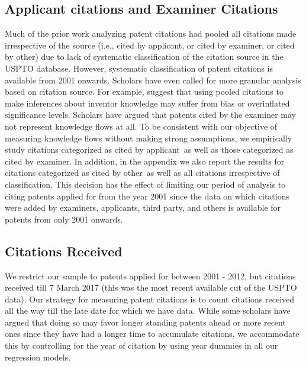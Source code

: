 \documentclass[12pt,letterpaper]{article}
\begin{document}
\subsection{Applicant citations and Examiner Citations}
Much of the prior work analyzing patent citations had pooled all citations made irrespective of the source (i.e., cited by applicant, or cited by examiner, or cited by other) due to lack of systematic classification of the citation source in the USPTO database. However, systematic classification of patent citations is available from 2001 onwards. Scholars have even called for more granular analysis based on citation source. For example, \cite{Alcacer2006a} suggest that using pooled citations to make inferences about inventor knowledge may suffer from bias or overinflated significance levels. Scholars have argued that patents cited by the examiner may not represent knowledge flows at all. To be consistent with our objective of measuring knowledge flows without making strong assumptions, we empirically study citations categorized as \textquotesingle cited by applicant\textquotesingle \ as well as those categorized as \textquotesingle cited by examiner\textquotesingle. In addition, in the appendix we also report the results for citations categorized as \textquotesingle cited by other\textquotesingle \ as well as all citations irrespective of classification. This decision has the  effect of limiting our period of analysis to citing patents applied for from the year 2001 since the data on which citations were added by examiners, applicants, third party, and others is available for patents from only 2001 onwards. 

\subsection{Citations Received}
We restrict our sample to patents applied for between 2001 - 2012, but citations received till 7 March 2017 (this was the most recent available cut of the USPTO data). Our strategy for measuring patent citations is to count citations received all the way till the late date for which we have data. While some scholars have argued that doing so may favor longer standing patents ahead or more recent ones since they have had a longer time to accumulate citations, we accommodate this by controlling for the year of citation by using year dummies in all our regression models. \par
\end{document}
